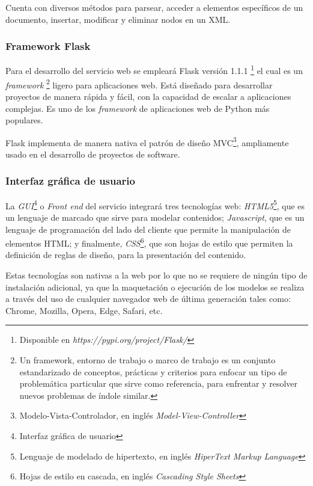 Cuenta con diversos m\'etodos para parsear, acceder a elementos espec\'ificos de un documento, insertar, modificar y eliminar nodos en un XML.

\subsubsection{Framework Flask}

Para el desarrollo del servicio web se emplear\'a Flask versi\'on 1.1.1 \footnote{Disponible en \emph{https://pypi.org/project/Flask/}} el cual es un \emph{framework} \footnote{Un framework, entorno de trabajo​ o marco de trabajo​ es un conjunto estandarizado de conceptos, pr\'acticas y criterios para enfocar un tipo de problem\'atica particular que sirve como referencia, para enfrentar y resolver nuevos problemas de \'indole similar.} ligero para aplicaciones web. Est\'a dise\~{n}ado para desarrollar proyectos de manera r\'apida y f\'acil, con la capacidad de escalar a aplicaciones complejas. Es uno de los \emph{framework} de aplicaciones web de Python m\'as populares.\newline

Flask implementa de manera nativa el patr\'on de dise\~{n}o MVC\footnote{Modelo-Vista-Controlador, en ingl\'es \emph{Model-View-Controller}}, ampliamente usado en el desarrollo de proyectos de software. \newline

\subsubsection{Interfaz gr\'afica de usuario}

La \emph{GUI}\footnote{Interfaz gr\'afica de usuario} o \emph{Front end} del servicio integrar\'a tres tecnolog\'ias web: \emph{HTML5}\footnote{Lenguaje de modelado de hipertexto, en ingl\'es \emph{HiperText Markup Language}}, que es un lenguaje de marcado que sirve para modelar contenidos; \emph{Javascript}, que es un lenguaje de programaci\'on del lado del cliente que permite la manipulaci\'on de elementos HTML; y finalmente, \emph{CSS}\footnote{Hojas de estilo en cascada, en ingl\'es \emph{Cascading Style Sheets}}, que son hojas de estilo que permiten la definici\'on de reglas de dise\~{n}o, para la presentaci\'on del contenido.

Estas tecnolog\'ias son nativas a la web por lo que no se requiere de ning\'un tipo de instalaci\'on adicional, ya que la maquetaci\'on o ejecuci\'on de los modelos se realiza a trav\'es del uso de cualquier navegador web de \'ultima generaci\'on tales como: Chrome, Mozilla, Opera, Edge, Safari, etc.

